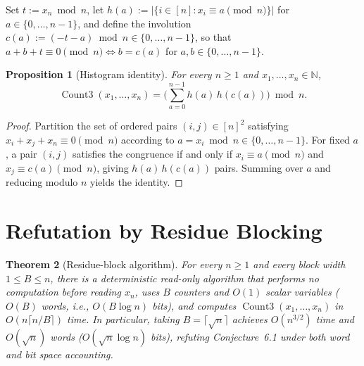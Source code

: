 \documentclass[11pt]{article}
\theoremstyle{plain}
\newtheorem{theorem}{Theorem}
\newtheorem{proposition}[theorem]{Proposition}
\theoremstyle{definition}
\theoremstyle{remark}
\DeclareMathOperator{\CountThree}{Count3}
\begin{document}
Set $t := x_n \bmod n$, let $h(a) := |\{i \in [n] : x_i \equiv a \pmod n\}|$ for $a \in \{0, \dots, n-1\}$, and define the involution $c(a) := (-t - a) \bmod n \in \{0, \dots, n-1\}$, so that $a + b + t \equiv 0 \pmod n \iff b = c(a)$ for $a, b \in \{0, \dots, n-1\}$.

\begin{proposition}[Histogram identity]\label{prop:hist}
For every $n \ge 1$ and $x_1, \dots, x_n \in \mathbb{N}$,
\[
\CountThree(x_1, \dots, x_n) = \biggl(\sum_{a=0}^{n-1} h(a)\, h(c(a))\biggr) \bmod n.
\]
\end{proposition}

\begin{proof}
Partition the set of ordered pairs $(i, j) \in [n]^2$ satisfying $x_i + x_j + x_n \equiv 0 \pmod n$ according to $a = x_i \bmod n \in \{0, \dots, n-1\}$. For fixed $a$, a pair $(i, j)$ satisfies the congruence if and only if $x_i \equiv a \pmod n$ and $x_j \equiv c(a) \pmod n$, giving $h(a)\,h(c(a))$ pairs. Summing over $a$ and reducing modulo $n$ yields the identity.
\end{proof}

\section{Refutation by Residue Blocking}

\begin{theorem}[Residue-block algorithm]\label{thm:blocked}
For every $n \ge 1$ and every block width $1 \le B \le n$, there is a deterministic read-only algorithm that performs no computation before reading $x_n$, uses $B$ counters and $O(1)$ scalar variables ($O(B)$ words, i.e., $O(B \log n)$ bits), and computes $\CountThree(x_1, \dots, x_n)$ in $O(n \lceil n/B \rceil)$ time.
In particular, taking $B = \lceil \sqrt{n} \rceil$ achieves $O(n^{3/2})$ time and $O(\sqrt{n})$ words ($O(\sqrt{n}\log n)$ bits), refuting Conjecture~6.1 under both word and bit space accounting.
\end{theorem}
\end{document}
